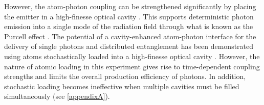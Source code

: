 \documentclass[../Thesis-IJspeert.tex]{subfiles}
\begin{document}
However, the atom-photon coupling can be strengthened significantly by placing the emitter in a high-finesse optical cavity \cite{Specht2011,Hijlkema2007}. This supports deterministic photon emission into a single mode of the radiation field through what is known as the Purcell effect \cite{Purcell1946}. The potential of a cavity-enhanced atom-photon interface for the delivery of single photons and distributed entanglement has been demonstrated using  atoms stochastically loaded into a high-finesse optical cavity \cite{Barrett2019}. However, the nature of atomic loading in this experiment gives rise to time-dependent coupling strengths and limits the overall production efficiency of photons. In addition, stochastic loading becomes ineffective when multiple cavities must be filled simultaneously (see \autoref{appendixA}).

	
\end{document}

